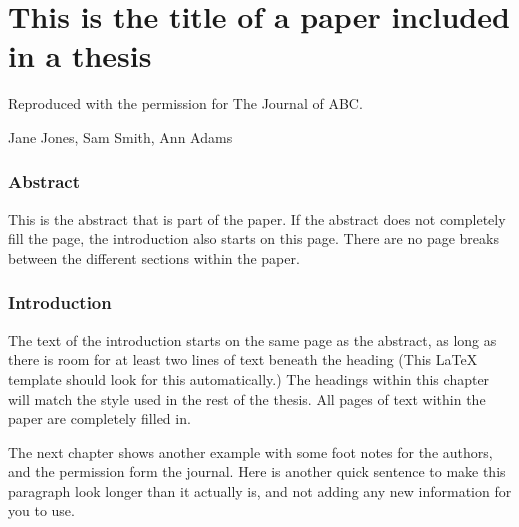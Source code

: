 \chapter{This is the title of a paper included in a thesis}

\begin{center}
    Reproduced with the permission for The Journal of ABC. 
    
    Jane Jones, Sam Smith, Ann Adams
\end{center}

\subsection{Abstract}

This is the abstract that is part of the paper. If the abstract does not completely fill the page, the introduction also starts on this page. There are no page breaks between the different sections within the paper.

\subsection{Introduction}

The text of the introduction starts on the same page as the abstract, as long as there is room for at least two lines of text beneath the heading (This \LaTeX{} template should look for this automatically.) The headings within this chapter will match the style used in the rest of the thesis. All pages of text within the paper are completely filled in.

The next chapter shows another example with some foot notes for the authors, and the permission form the journal. Here is another quick sentence to make this paragraph look longer than it actually is, and not adding any new information for you to use.